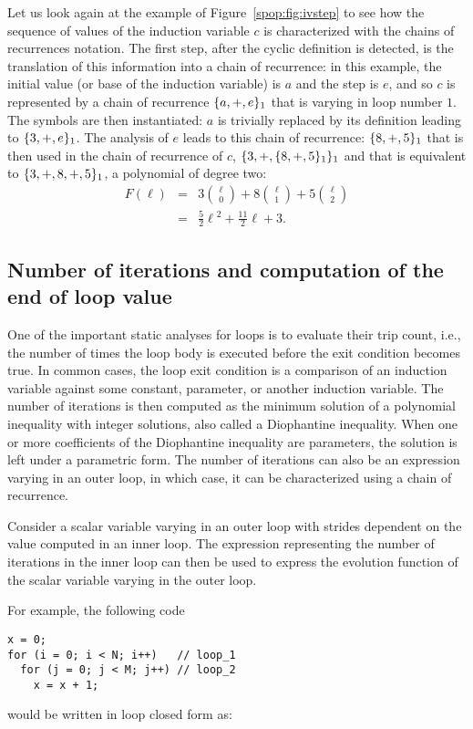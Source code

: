 {Let us look again at the example of Figure~\ref{spop:fig:ivstep} to see
how the sequence of values of the induction variable $c$ is
characterized with the chains of recurrences notation.  The first
step, after the cyclic definition is detected, is the translation of
this information into a chain of recurrence: in this example, the
initial value (or base of the induction variable) is $a$ and the
step is $e$, and so $c$ is represented by a chain of recurrence
$\{a, +, e\}_1$ that is varying in loop number $1$.  The symbols
are then instantiated: $a$ is trivially replaced by its definition
leading to $\{3, +, e\}_1$.  The analysis of $e$ leads to this
chain of recurrence: $\{8, +, 5\}_1$ that is then used in the
chain of recurrence of $c$, $\{3, +, \{8, +, 5\}_1\}_1$ and
that is equivalent to $\{3, +, 8, +, 5\}_1$, a polynomial of
degree two:
\begin{eqnarray*}
  F(\ell)
  &=& 3\binom{\ell}{0} + 8\binom{\ell}{1} + 5\binom{\ell}{2} \\
  &=& \frac{5}{2}\ell{}^2+\frac{11}{2}\ell + 3.
\end{eqnarray*}

\subsection{Number of iterations and computation of the end of loop value}

One of the important static analyses for loops is to evaluate their
trip count, i.e., the number of times the loop body is executed before
the exit condition becomes true.  In common cases, the loop exit
condition is a comparison of an induction variable against some
constant, parameter, or another induction variable.  The number of
iterations is then computed as the minimum solution of a polynomial
inequality with integer solutions, also called a Diophantine
inequality.  When one or more coefficients of the Diophantine
inequality are parameters, the solution is left under a parametric
form.  The number of iterations can also be an expression varying in
an outer loop, in which case, it can be characterized using a chain of
recurrence.

Consider a scalar variable varying in an outer loop with strides
dependent on the value computed in an inner loop.  The expression
representing the number of iterations in the inner loop can then be
used to express the evolution function of the scalar variable varying
in the outer loop.

For example, the following code
\begin{verbatim}
x = 0;
for (i = 0; i < N; i++)   // loop_1
  for (j = 0; j < M; j++) // loop_2
    x = x + 1;
\end{verbatim}
would be written in loop closed \SSA{} form as:

}
